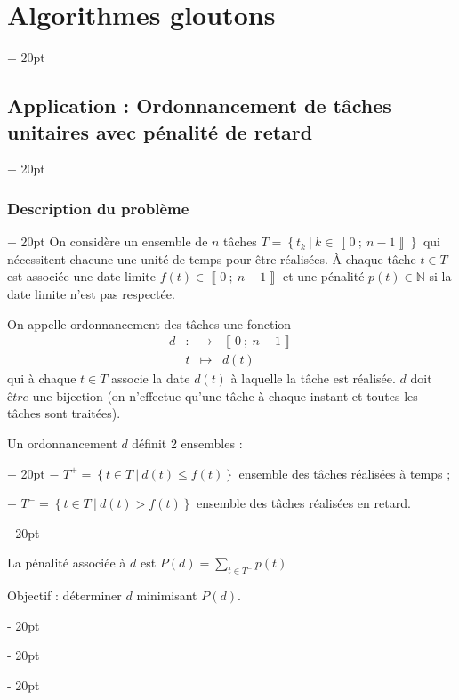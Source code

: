 \documentclass[a4paper, 12pt, twoside]{article}
\newcommand{\N}{\mathbb{N}} %
\newcommand{\nset}[2]{\left\llbracket #1\ ;\ #2 \right\rrbracket}
\newcommand{\set}[1]{\left\{ #1 \right\}}
\renewcommand{\le}{\leqslant}
\newcommand{\ind}[1][20pt]{\advance\leftskip + #1}
\newcommand{\deind}[1][20pt]{\advance\leftskip - #1}
\newenvironment{indt}[2][20pt]{#2 \par \ind[#1]}{\par \deind} %
\begin{document}
\begin{indt}{\section{Algorithmes gloutons}}
        \begin{indt}{\subsection{Application : Ordonnancement de tâches unitaires avec pénalité de retard}}
            \begin{indt}{\subsubsection{Description du problème}}
                On considère un ensemble de $n$ tâches $T = \set{t_k\ |\ k \in \nset{0}{n - 1}}$ qui nécessitent chacune une unité de temps pour être réalisées. \`A chaque tâche $t \in T$ est associée une date limite $f(t) \in \nset{0}{n - 1}$ et une pénalité $p(t) \in \N$ si la date limite n'est pas respectée.
                
                On appelle ordonnancement des tâches une fonction
                    \[
                        \begin{array}{rcccc}
                            d & : & \longrightarrow & \nset{0}{n - 1}
                            \\
                            & t & \longmapsto & d(t)
                        \end{array}
                    \]
                qui à chaque $t \in T$ associe la date $d(t)$ à laquelle la tâche est réalisée. $d$ doit $être$ une bijection (on n'effectue qu'une tâche à chaque instant et toutes les tâches sont traitées).
                
                \vspace{6pt}
                
                \begin{indt}{Un ordonnancement $d$ définit 2 ensembles :}
                    $-$ $T^+ = \set{t \in T\ |\ d(t) \le f(t)}$ ensemble des tâches réalisées à temps ;
                    
                    $-$ $T^- = \set{t \in T\ |\ d(t) > f(t)}$ ensemble des tâches réalisées en retard.
                \end{indt}
                
                \vspace{6pt}
                
                La pénalité associée à $d$ est $\displaystyle P(d) = \sum_{ t \in T^-} p(t)$
                
                Objectif : déterminer $d$ minimisant $P(d)$.
                

\end{indt}
\end{indt}
\end{indt}
\end{document}
